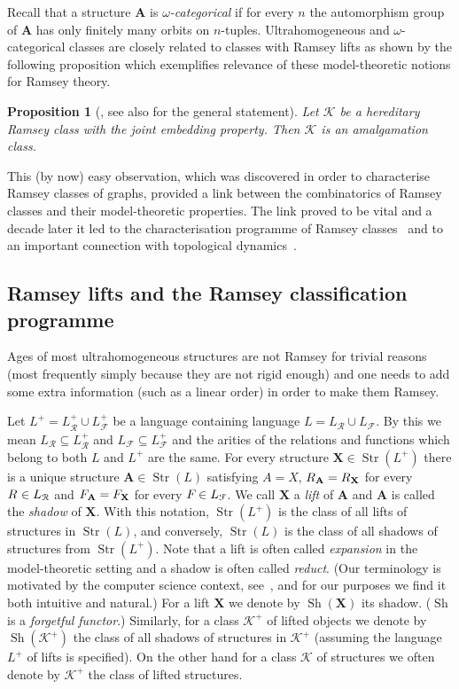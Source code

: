 \documentclass{elsarticle}
\def\Str{\mathop{\mathrm{Str}}\nolimits}
\def\sh{\mathop{\mathrm{Sh}}\nolimits}
\def\str#1{\mathbf {#1}}
\def\nbrel#1#2{R\ifstrempty{#1}{}{_{#1}}\ifstrempty{#2}{}{^{#2}}}
\def\rel#1#2{\nbrel{\ifstrempty{#1}{}{\str{#1}}}{#2}}
\def\func#1#2{\nbfunc{\ifstrempty{#1}{}{\str{#1}}}{#2}}
\def\nbfunc#1#2{F\ifstrempty{#1}{}{_{#1}}\ifstrempty{#2}{}{^{#2}}}
\def\K{{\mathcal K}}
\theoremstyle{plain}
\newtheorem{prop}[theorem]{Proposition}
\theoremstyle{definition}
\theoremstyle{remark}
\begin{document}
Recall that a structure $\str{A}$ is \emph{$\omega$-categorical} if for every $n$ the
automorphism group of $\str{A}$ has only finitely many orbits on $n$-tuples. 
Ultrahomogeneous and $\omega$-categorical classes are
closely related to classes with Ramsey lifts as shown by the following 
proposition which exemplifies relevance of these model-theoretic
notions for Ramsey theory. 
\begin{prop}[\cite{Nevsetvril1989a}, see also \cite{Nevsetril2005,Kechris2005} for the general statement]
\label{prop:ramseyhomo}
Let $\mathcal K$ be a hereditary Ramsey class with the joint embedding property.
Then $\mathcal K$ is an amalgamation class.
\end{prop}
This (by now) easy observation, which was discovered in
order to characterise Ramsey classes of graphs, provided a link between the combinatorics of Ramsey
classes  and their model-theoretic properties. The link proved to
be vital and a decade later it led to the characterisation programme
of Ramsey classes~\cite{Nevsetril2005}  and to an important connection with
topological dynamics~\cite{Kechris2005}.


\subsection{Ramsey lifts and the Ramsey classification programme}
Ages of most ultrahomogeneous structures are not Ramsey for trivial reasons (most
frequently simply because they are not rigid enough) and one needs to add some extra information (such as a linear order) in order to make them Ramsey.

Let $L^+=L^+_\mathcal R\cup L^+_\mathcal F$ be a language containing language $L=L_\mathcal R\cup L_\mathcal F$. By this we mean $L_\mathcal R\subseteq L_\mathcal R^+$ and $L_\mathcal F\subseteq L^+_\mathcal F$ and the arities of the relations and functions which belong to both $L$ and $L^+$ are the same.
For every structure $\str{X}\in \Str(L^+)$ there is a unique structure $\str{A}\in \Str(L)$ satisfying $A=X$, $\rel{A}{}=\rel{X}{}$ for every $\rel{}{}\in L_\mathcal R$ and $\func{A}{}=\func{X}{}$ for every $\func{}{}\in L_\mathcal F$.
 We call $\str{X}$ a \emph{lift} of $\str{A}$ and $\str{A}$ is called the \emph{shadow} of $\str{X}$. With this notation, $\Str(L^+)$ is the class of all lifts of structures in $\Str(L)$, and conversely, $\Str(L)$ is the class of all shadows of structures from $\Str(L^+)$.
 Note that a lift is often called \emph{expansion} in the model-theoretic setting and a shadow is often called \emph{reduct}.
(Our terminology is motivated by the computer science context, see~\cite{Kun2008}, and for our purposes we find it both intuitive and natural.)
For a lift $\str X$ we denote by $\sh(\str{X})$  its shadow. ($\sh$
is a \emph{forgetful functor}.) Similarly, for a class $\K^+$
of lifted objects we denote by $\sh(\K^+)$ the class of all shadows
of structures in $\K^+$ (assuming the language $L^+$ of lifts is specified).
On the other hand for a class $\K$ of structures we often denote by $\K^+$ the class of lifted structures.
\end{document}

